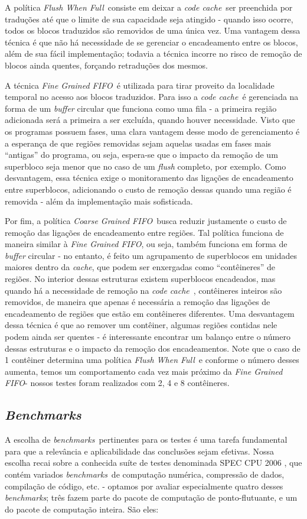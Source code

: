 \documentclass[11pt,twoside]{article}
\newcommand{\ccache}{\emph{code cache}}
\newcommand{\cache}{\emph{cache}}
\newcommand{\benchmarks}{\emph{benchmarks}}
\newcommand{\flush}{\emph{Flush When Full}}
\newcommand{\finefifo}{\emph{Fine Grained FIFO}}
\newcommand{\coarsefifo}{\emph{Coarse Grained FIFO}}
\newcommand{\qq}[1]{``#1''}
\begin{document}
A política \flush~consiste em deixar a \ccache~ser preenchida por traduções até que o limite de sua capacidade seja atingido - quando isso ocorre, todos os blocos traduzidos são removidos de uma única vez. Uma vantagem dessa técnica é que não há necessidade de se gerenciar o encadeamento entre os blocos, além de sua fácil implementação; todavia a técnica incorre no risco de remoção de blocos ainda quentes, forçando retraduções dos mesmos. 

A técnica \finefifo~é utilizada para tirar proveito da localidade temporal no acesso aos blocos traduzidos. Para isso a \ccache~é gerenciada na forma de um \emph{buffer} circular que funciona como uma fila - a primeira região adicionada será a primeira a ser excluída, quando houver necessidade. Visto que os programas possuem fases, uma clara vantagem desse modo de gerenciamento é a esperança de que regiões removidas sejam aquelas usadas em fases mais \qq{antigas} do programa, ou seja, espera-se que o impacto da remoção de um superbloco seja menor que no caso de um \emph{flush} completo, por exemplo. Como desvantagem, essa técnica exige o monitoramento das ligações de encadeamento entre superblocos, adicionando o custo de remoção dessas quando uma região é removida - além da implementação mais sofisticada.

Por fim, a política \coarsefifo~busca reduzir justamente o custo de remoção das ligações de encadeamento entre regiões. Tal política funciona de maneira similar à \finefifo, ou seja, também funciona em forma de \emph{buffer} circular - no entanto, é feito um agrupamento de superblocos em unidades maiores dentro da \cache, que podem ser enxergadas como \qq{contêineres} de regiões. No interior dessas estruturas existem superblocos encadeados, mas quando há a necessidade de remoção na \ccache~, contêineres inteiros são removidos, de maneira que apenas é necessária a remoção das ligações de encadeamento de regiões que estão em contêineres diferentes. Uma desvantagem dessa técnica é que ao remover um contêiner, algumas regiões contidas nele podem ainda ser quentes - é interessante encontrar um balanço entre o número dessas estruturas e o impacto da remoção dos encadeamentos. Note que o caso de 1 contêiner determina uma política \flush~e conforme o número desses aumenta, temos um comportamento cada vez mais próximo da \finefifo - nossos testes foram realizados com 2, 4 e 8 contêineres.


\subsection{\emph{Benchmarks}}
A escolha de \benchmarks~pertinentes para os testes é uma tarefa fundamental para que a relevância e aplicabilidade das conclusões sejam efetivas. Nossa escolha recai sobre a conhecida suíte de testes denominada SPEC CPU 2006 \cite{spec-url}, que contém variados \benchmarks~de computação numérica, compressão de dados, compilação de código, etc. - optamos por avaliar especialmente quatro desses \benchmarks; três fazem parte do pacote de computação de ponto-flutuante, e um do pacote de computação inteira. São eles:
\end{document}
